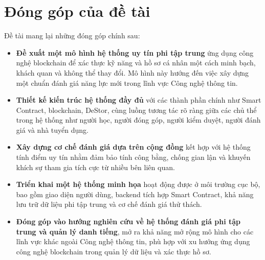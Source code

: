 \section{Đóng góp của đề tài}
Đề tài mang lại những đóng góp chính sau:

\begin{itemize}
  \item \textbf{Đề xuất một mô hình hệ thống uy tín phi tập trung} ứng dụng công nghệ blockchain để xác thực kỹ năng và hồ sơ cá nhân một cách minh bạch, khách quan và không thể thay đổi. Mô hình này hướng đến việc xây dựng một chuẩn đánh giá năng lực mới trong lĩnh vực Công nghệ thông tin.
  \item \textbf{Thiết kế kiến trúc hệ thống đầy đủ} với các thành phần chính như Smart Contract, blockchain, DeStor, cùng luồng tương tác rõ ràng giữa các chủ thể trong hệ thống như người học, người đóng góp, người kiểm duyệt, người đánh giá và nhà tuyển dụng.
  \item \textbf{Xây dựng cơ chế đánh giá dựa trên cộng đồng} kết hợp với hệ thống tính điểm uy tín nhằm đảm bảo tính công bằng, chống gian lận và khuyến khích sự tham gia tích cực từ nhiều bên liên quan.
  \item \textbf{Triển khai một hệ thống minh họa} hoạt động được ở môi trường cục bộ, bao gồm giao diện người dùng, backend tích hợp Smart Contract, khả năng lưu trữ dữ liệu phi tập trung và cơ chế đánh giá thử thách.
  \item \textbf{Đóng góp vào hướng nghiên cứu về hệ thống đánh giá phi tập trung và quản lý danh tiếng}, mở ra khả năng mở rộng mô hình cho các lĩnh vực khác ngoài Công nghệ thông tin, phù hợp với xu hướng ứng dụng công nghệ blockchain trong quản lý dữ liệu và xác thực hồ sơ.
\end{itemize}